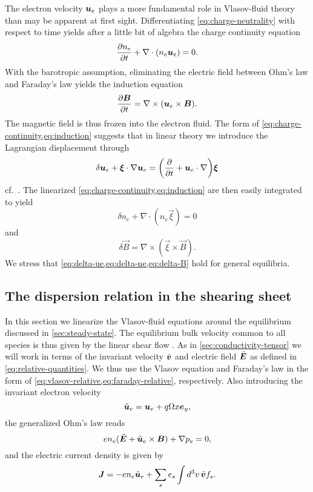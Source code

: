\documentclass[aps,pre,notitlepage,amsmath,amssymb,amsfonts,nobibnotes,nofootinbib]{revtex4-1}
\begin{document}
The electron velocity $\bm{u}_e$ plays a more fundamental role in Vlasov-fluid
theory than may be apparent at first sight. Differentiating
\cref{eq:charge-neutrality} with respect to time yields after a little bit of
algebra the charge continuity equation
\begin{equation}
  \label{eq:charge-continuity}
  \pder{n_e}{t} + \nabla\cdot(n_e\vec{u}_e) = 0.
\end{equation}
With the barotropic assumption, eliminating the electric field between Ohm's
law and Faraday's law yields the induction equation
\begin{equation}
  \label{eq:induction}
  \pder{\vec{B}}{t} = \nabla\times(\vec{u}_e\times\vec{B}).
\end{equation}
The magnetic field is thus frozen into the electron fluid. The form of
\cref{eq:charge-continuity,eq:induction} suggests that in linear theory we
introduce the Lagrangian displacement through
\begin{equation}
  \label{eq:delta-ue}
  \delta\ue + \vec{\xi}\cdot\nabla\ue =
  \left(\pder{}{t} + \ue\cdot\nabla\right)\vec{\xi}
\end{equation}
cf.\ \citet{Lynden-Bell1967,Friedman1978}. The linearized
\cref{eq:charge-continuity,eq:induction} are then easily integrated to yield
\begin{equation}
  \label{eq:delta-ne}
  \delta n_e + \nabla\cdot(n_e\vec{\xi}) = 0
\end{equation}
and
\begin{equation}
  \label{eq:delta-B}
  \delta\vec{B} = \nabla\times(\vec{\xi}\times\vec{B}).
\end{equation}
We stress that \cref{eq:delta-ue,eq:delta-ne,eq:delta-B} hold for general
equilibria.

\subsection{The dispersion relation in the shearing sheet}

In this section we linearize the Vlasov-fluid equations around the equilibrium
discussed in \cref{sec:steady-state}. The equilibrium bulk velocity common to
all species is thus given by the linear shear flow .
As in \cref{sec:conductivity-tensor} we will work in terms of the invariant
velocity $\tilde{\bm{v}}$ and electric field $\tilde{\bm{E}}$ as defined in
\cref{eq:relative-quantities}. We thus use the Vlasov equation and Faraday's
law in the form of \cref{eq:vlasov-relative,eq:faraday-relative},
respectively. Also introducing the invariant electron velocity
\begin{equation}
  \tilde{\bm{u}}_e = \bm{u}_e + q\Omega x\bm{e}_y,
\end{equation}
the generalized Ohm's law reads
\begin{equation}
  \label{eq:ohms-law-relative}
  e n_e(\tvec{E} + \tue\times\vec{B}) + \nabla\pe = 0,
\end{equation}
and the electric current density is given by
\begin{equation}
  \label{eq:ampere-relative}
  \vec{J} = -en_e\tilde{\vec{u}}_e + \sums \qs\int d^3v\,\tvec{v} f_s.
\end{equation}
\end{document}
